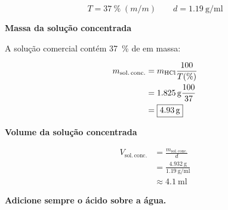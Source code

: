 \documentclass[a4paper,12pt]{article}
\newcommand{\subtitulo}[1]{%
  \par\medskip
  {\color{quadroazul}\bfseries\large #1}\par\smallskip
}
\begin{document}
\begin{minipage}[t]{0.48\textwidth}
\begin{tcolorbox}[
  title=Dados da solução concentrada de \ce{HCl},
  colback=quadrocinza,
  colframe=black!65,
  boxrule=0.6pt,
  arc=1mm
]
\[
  T = \qty{37}{\percent}\;(m/m)
  \qquad
  d = \qty{1.19}{\gram\per\milli\litre}
\]
\end{tcolorbox}

\subtitulo{Massa da solução concentrada}

A solução comercial contém \qty{37}{\percent} de  em massa:

\begin{align*}
  m_{\mathrm{sol.\,conc.}}
    &= m_{\ce{HCl}}\frac{100}{T(\%)} \\
    &= \qty{1.825}{\gram}\frac{100}{37} \\
    &= \boxed{\qty{4.93}{\gram}}
\end{align*}

\subtitulo{Volume da solução concentrada}

\begin{align*}
  V_{\mathrm{sol.\,conc.}}
    &= \frac{m_{\mathrm{sol.\,conc.}}}{d} \\
    &= \frac{\qty{4.932}{\gram}}
             {\qty{1.19}{\gram\per\milli\litre}} \\
    &\approx \boxed{\qty{4.1}{\milli\litre}}
\end{align*}
\end{minipage}

\vspace{0.5cm}

\begin{tcolorbox}[
  colback=quadrovermelho!6,
  colframe=quadrovermelho,
  boxrule=1pt,
  arc=2mm
]
\centering
{\color{quadrovermelho}\bfseries\Large Adicione sempre o ácido sobre a água.}
\end{tcolorbox}
\end{document}

